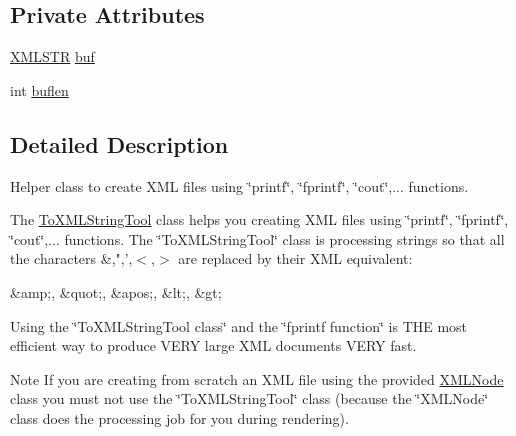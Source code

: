 \subsection*{Private Attributes}
\begin{DoxyCompactItemize}
\item 
\hyperlink{xmlParser_8h_a849d96105aa0c8f64b5c10d9151a3cdc}{X\-M\-L\-S\-T\-R} \hyperlink{structToXMLStringTool_a7c1744df32f207ecc8e4e478c350e83a}{buf}
\item 
int \hyperlink{structToXMLStringTool_a3d8ae5dc73498c16afdb2905bf00c9d0}{buflen}
\end{DoxyCompactItemize}


\subsection{Detailed Description}
Helper class to create X\-M\-L files using \char`\"{}printf\char`\"{}, \char`\"{}fprintf\char`\"{}, \char`\"{}cout\char`\"{},... functions. 

The \hyperlink{structToXMLStringTool}{To\-X\-M\-L\-String\-Tool} class helps you creating X\-M\-L files using \char`\"{}printf\char`\"{}, \char`\"{}fprintf\char`\"{}, \char`\"{}cout\char`\"{},... functions. The \char`\"{}\-To\-X\-M\-L\-String\-Tool\char`\"{} class is processing strings so that all the characters \&,",',$<$,$>$ are replaced by their X\-M\-L equivalent\-: \begin{DoxyVerb}&amp;, &quot;, &apos;, &lt;, &gt; \end{DoxyVerb}
 Using the \char`\"{}\-To\-X\-M\-L\-String\-Tool class\char`\"{} and the \char`\"{}fprintf function\char`\"{} is T\-H\-E most efficient way to produce V\-E\-R\-Y large X\-M\-L documents V\-E\-R\-Y fast. \begin{DoxyNote}{Note}
If you are creating from scratch an X\-M\-L file using the provided \hyperlink{structXMLNode}{X\-M\-L\-Node} class you must not use the \char`\"{}\-To\-X\-M\-L\-String\-Tool\char`\"{} class (because the \char`\"{}\-X\-M\-L\-Node\char`\"{} class does the processing job for you during rendering). 
\end{DoxyNote}


